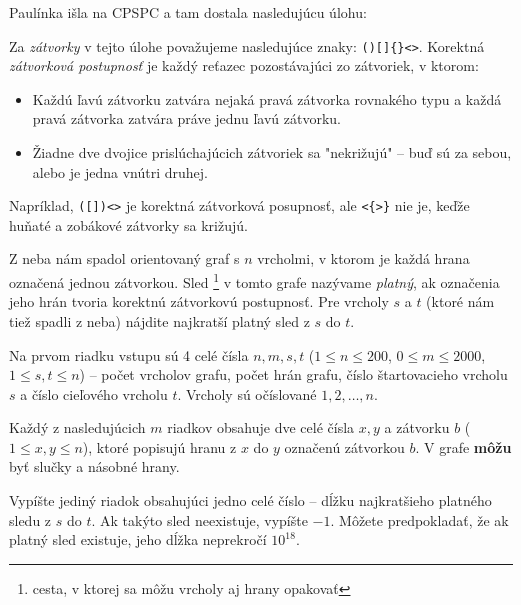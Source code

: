 
\usepackage[slovak]{babel}








Paulínka išla na CPSPC a tam dostala nasledujúcu úlohu:


Za \emph{zátvorky} v tejto úlohe považujeme nasledujúce znaky: \texttt{()[]\{\}<>}. Korektná \emph{zátvorková postupnosť} je každý reťazec pozostávajúci zo zátvoriek, v ktorom:
\begin{itemize}
 \item Každú ľavú zátvorku zatvára nejaká pravá zátvorka rovnakého typu a každá pravá zátvorka zatvára práve jednu ľavú zátvorku.
 \item Žiadne dve dvojice prislúchajúcich zátvoriek sa "nekrižujú" -- buď sú za sebou, alebo je jedna vnútri druhej.
\end{itemize}
Napríklad, \texttt{([])<>} je korektná zátvorková posupnosť, ale \texttt{<\{>\}} nie je, keďže huňaté a zobákové zátvorky sa križujú.

Z neba nám spadol orientovaný graf s $n$ vrcholmi, v ktorom je každá hrana označená jednou zátvorkou. Sled \footnote{cesta, v ktorej sa môžu vrcholy aj hrany opakovať} v tomto grafe nazývame \emph{platný}, ak
označenia jeho hrán tvoria korektnú zátvorkovú postupnosť. Pre vrcholy $s$ a $t$ (ktoré nám tiež spadli
z neba) nájdite najkratší platný sled z $s$ do $t$.


Na prvom riadku vstupu sú 4 celé čísla $n, m, s, t$ ($1 \leq n \leq 200$, $0 \leq m \leq 2000$, $1 \leq s, t \leq n$) -- počet vrcholov grafu, počet hrán grafu, číslo štartovacieho vrcholu $s$ a číslo cieľového vrcholu $t$. Vrcholy sú očíslované $1, 2, \dots, n$.

Každý z nasledujúcich $m$ riadkov obsahuje dve celé čísla $x, y$ a zátvorku $b$ ($1 \leq x, y \leq n$), ktoré popisujú hranu z $x$ do $y$ označenú zátvorkou $b$. V grafe \textbf{môžu} byť slučky a násobné hrany.


Vypíšte jediný riadok obsahujúci jedno celé číslo -- dĺžku najkratšieho platného sledu z $s$ do $t$. Ak
takýto sled neexistuje, vypíšte $-1$. Môžete predpokladať, že ak platný sled existuje, jeho dĺžka neprekročí $10^{18}$.

